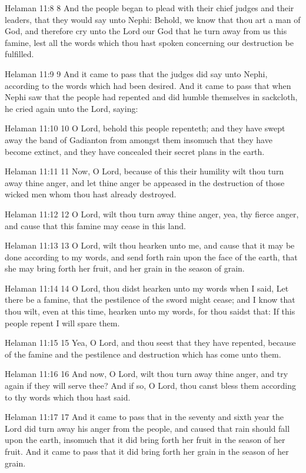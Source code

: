 Helaman 11:8
 8 And the people began to plead with their chief judges and
their leaders, that they would say unto Nephi: Behold, we know
that thou art a man of God, and therefore cry unto the Lord our
God that he turn away from us this famine, lest all the words
which thou hast spoken concerning our destruction be fulfilled.

Helaman 11:9
 9 And it came to pass that the judges did say unto Nephi,
according to the words which had been desired. And it came to
pass that when Nephi saw that the people had repented and did
humble themselves in sackcloth, he cried again unto the Lord,
saying:

Helaman 11:10
 10 O Lord, behold this people repenteth; and they have swept
away the band of Gadianton from amongst them insomuch that they
have become extinct, and they have concealed their secret plans
in the earth.

Helaman 11:11
 11 Now, O Lord, because of this their humility wilt thou turn
away thine anger, and let thine anger be appeased in the
destruction of those wicked men whom thou hast already destroyed.

Helaman 11:12
 12 O Lord, wilt thou turn away thine anger, yea, thy fierce
anger, and cause that this famine may cease in this land.

Helaman 11:13
 13 O Lord, wilt thou hearken unto me, and cause that it may be
done according to my words, and send forth rain upon the face of
the earth, that she may bring forth her fruit, and her grain in
the season of grain.

Helaman 11:14
 14 O Lord, thou didst hearken unto my words when I said, Let
there be a famine, that the pestilence of the sword might cease;
and I know that thou wilt, even at this time, hearken unto my
words, for thou saidst that: If this people repent I will spare
them.

Helaman 11:15
 15 Yea, O Lord, and thou seest that they have repented, because
of the famine and the pestilence and destruction which has come
unto them.

Helaman 11:16
 16 And now, O Lord, wilt thou turn away thine anger, and try
again if they will serve thee? And if so, O Lord, thou canst
bless them according to thy words which thou hast said.

Helaman 11:17
 17 And it came to pass that in the seventy and sixth year the
Lord did turn away his anger from the people, and caused that
rain should fall upon the earth, insomuch that it did bring forth
her fruit in the season of her fruit. And it came to pass that
it did bring forth her grain in the season of her grain.

